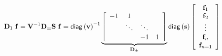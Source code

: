 \begin{equation}
\mathbf{D}_{\sf 1}~\mathbf{f} = \mathbf{V}^{-1}\mathbf{D}_\pm \mathbf{S}~\mathbf{f} =
    {\sf diag}\left( \mathbf{v} \right)^{-1}
    \underbrace{
    \left[ \begin{array}{cccc}
        -1 & 1      &        &      \\
           & \ddots & \ddots &       \\
           &        &   -1   &   1    \\
    \end{array} \right]
    }_{\mathbf{D}_\pm}
    {\sf diag}\left( \mathbf{s} \right)
    \left[ \begin{array}{c}
    \mathbf{f}_{1}\\
    \mathbf{f}_{2}\\
    \vdots\\
    \mathbf{f}_{n}\\
    \mathbf{f}_{n+1}\\
    \end{array} \right]
\end{equation}
